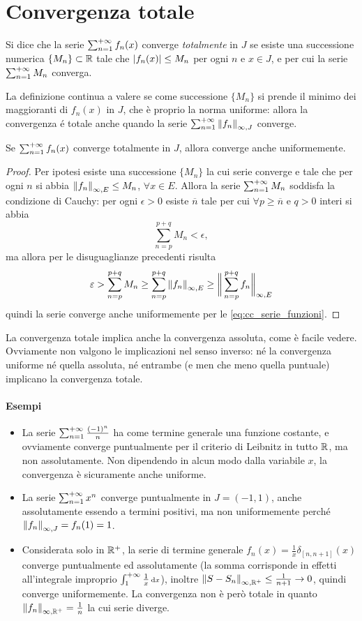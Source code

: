\section{Convergenza totale}
\begin{definizione}
Si dice che la serie $\sum_{{n}=1}^{+\infty}f_n(x)$ converge \emph{totalmente} in $J$ se esiste una successione numerica $\{M_n\}\subset\mathbb{R}$ tale che $\left|{f_n(x)}\right|\leq M_n$ per ogni $n$ e $x\in J$, e per cui la serie $\sum_{{n}=1}^{+\infty}M_n$ converga.
\end{definizione}
La definizione continua a valere se come successione $\{M_n\}$ si prende il minimo dei maggioranti di $f_n(x)$ in $J$, che è proprio la norma uniforme: allora la convergenza é totale anche quando la serie $\sum_{{n}=1}^{+\infty}\left\|{f_n}\right\|_{\infty,J}$ converge.
\begin{teorema}[di Weierstrass]
Se $\sum_{{n}=1}^{+\infty}f_n(x)$ converge totalmente in $J$, allora converge anche uniformemente.
\end{teorema}
\begin{proof}
Per ipotesi esiste una successione $\{M_n\}$ la cui serie converge e tale che per ogni $n$ si abbia $\left\|{f_n}\right\|_{\infty,E}\leq M_n$, $\forall x\in E$. Allora la serie $\sum_{{n}=1}^{+\infty}M_n$ soddisfa la condizione di Cauchy: per ogni $\epsilon>0$ esiste $\overline{n}$ tale per cui $\forall p\geq\overline{n}$ e $q>0$ interi si abbia
\[
\sum_{n=p}^{p+q}M_n<\epsilon,
\]
ma allora per le disuguaglianze precedenti risulta
\[
\varepsilon>\sum_{n=p}^{p+q}M_n\geq\sum_{n=p}^{p+q}\left\|{f_n}\right\|_{\infty,E}\geq\bigg\|\sum_{n=p}^{p+q}f_n\bigg\|_{\infty,E}
\]
quindi la serie converge anche uniformemente per le \eqref{eq:cc_serie_funzioni}.
\end{proof}
La convergenza totale implica anche la convergenza assoluta, come è facile vedere. Ovviamente non valgono le implicazioni nel senso inverso: né la convergenza uniforme né quella assoluta, né entrambe (e men che meno quella puntuale) implicano la convergenza totale.
\paragraph{Esempi}
\begin{itemize}
\item La serie $\sum_{{n}=1}^{+\infty}\frac{(-1)^n}{n}$ ha come termine generale una funzione costante, e ovviamente converge puntualmente per il criterio di Leibnitz in tutto $\mathbb{R}$, ma non assolutamente. Non dipendendo in alcun modo dalla variabile $x$, la convergenza è sicuramente anche uniforme.
\item La serie $\sum_{{n}=1}^{+\infty}x^n$ converge puntualmente in $J=(-1,1)$, anche assolutamente essendo a termini positivi, ma non uniformemente perché $\left\|{f_n}\right\|_{\infty,J}=f_n(1)=1$.
\item Considerata solo in $\mathbb{R}^+$, la serie di termine generale $f_n(x)=\frac1{x}\delta_{[n,n+1]}\scriptstyle(x)$ converge puntualmente ed assolutamente (la somma corrisponde in effetti all'integrale improprio $\int_1^{+\infty}\frac1{x}\,\scriptstyle\textup{d} x$), inoltre $\left\|{S-S_n}\right\|_{\infty,\mathbb{R}^+}\leq\frac1{n+1}\to 0$, quindi converge uniformemente. La convergenza non è però totale in quanto $\left\|{f_n}\right\|_{\infty,\mathbb{R}^+}=\frac1{n}$ la cui serie diverge.
\end{itemize}

